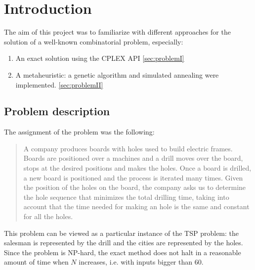 
\section{Introduction}
The aim of this project was to familiarize with different approaches for the solution of a well-known combinatorial problem, especially:
\begin{enumerate}
	\item An exact solution using the CPLEX API \ref{sec:problemI}
	
	\item A metaheuristic: a genetic algorithm and simulated annealing were implemented. \ref{sec:problemII}
\end{enumerate}
\subsection{Problem description}
The assignment of the problem was the following:
\begin{quote}
	A company produces boards with holes used to build electric frames. Boards are positioned over a 
	machines and a drill moves over the board, stops at the desired positions
	and makes the holes. Once a board is drilled, a new board is positioned and the process is
	iterated many times. Given the position of the holes on the board, the company asks us
	to determine the hole sequence that minimizes the total drilling time, taking into account
	that the time needed for making an hole is the same and constant for all the holes.
\end{quote}
This problem can be viewed as a particular instance of the TSP problem: the salesman is represented by the 
drill and the cities are represented by the holes.
Since the problem is NP-hard, the exact method does not halt in a reasonable amount of time when $N$ increases, i.e. with inputs bigger than $60$.
 

